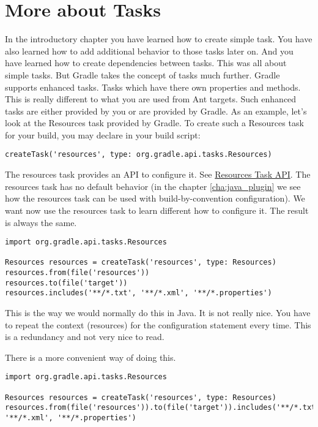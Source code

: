 \chapter{More about Tasks} %
\label{cha:more_about_tasks}
In the introductory chapter you have learned how to create simple task. You have also learned how to add additional behavior to those tasks later on. And you have learned how to create dependencies between tasks. This was all about simple tasks. But Gradle takes the concept of tasks much further. Gradle supports enhanced tasks. Tasks which have there own properties and methods. This is really different to what you are used from Ant targets. Such enhanced tasks are either provided by you or are provided by Gradle.
As an example, let's look at the Resources task provided by Gradle. To create such a Resources task for your build, you may declare in your build script:

\begin{Verbatim}
createTask('resources', type: org.gradle.api.tasks.Resources)
\end{Verbatim}

The resources task provides an API to configure it. See \href{\api_root/}{Resources Task API}. The resources task has no default behavior (in the chapter \ref{cha:java_plugin} we see how the resources task can be used with build-by-convention configuration). We want now use the resources task to learn different how to configure it. The result is always the same.

\begin{Verbatim}
import org.gradle.api.tasks.Resources

Resources resources = createTask('resources', type: Resources)
resources.from(file('resources'))
resources.to(file('target'))
resources.includes('**/*.txt', '**/*.xml', '**/*.properties')	
\end{Verbatim}

This is the way we would normally do this in Java. It is not really nice. You have to repeat the context (resources) for the configuration statement every time. This is a redundancy and not very nice to read.

There is a more convenient way of doing this.

\begin{Verbatim}
import org.gradle.api.tasks.Resources

Resources resources = createTask('resources', type: Resources)
resources.from(file('resources')).to(file('target')).includes('**/*.txt', '**/*.xml', '**/*.properties')	
\end{Verbatim}

